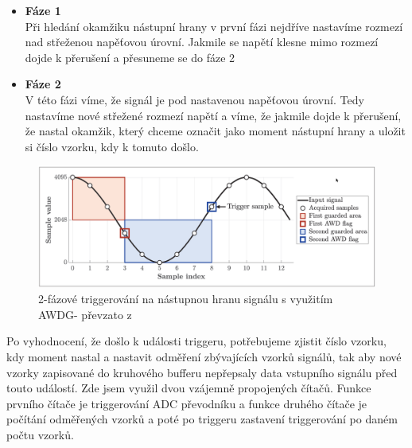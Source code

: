 \begin{itemize}
	\item \textbf{Fáze 1}\\
	Při hledání okamžiku nástupní hrany v první fázi nejdříve nastavíme rozmezí nad střeženou napěťovou úrovní. Jakmile se napětí klesne mimo rozmezí dojde k přerušení a přesuneme se do fáze 2 
	\item \textbf{Fáze 2}\\
	V této fázi víme, že signál je pod nastavenou napěťovou úrovní. Tedy nastavíme nové střežené rozmezí napětí a víme, že jakmile dojde k přerušení, že nastal okamžik, který chceme označit jako moment nástupní hrany a uložit si číslo vzorku, kdy k tomuto došlo.
\end{itemize}
\begin{figure}[H]
	\centering
	\includegraphics[width=1\linewidth]{Figs/Graphs/AWDG_Trigger}
	\caption{2-fázové triggerování na nástupnou hranu signálu s využitím AWDG- převzato z \cite{DujavaDIP}}
	\label{fig:awdgtrigger}
\end{figure}

Po vyhodnocení, že došlo k události triggeru, potřebujeme zjistit číslo vzorku, kdy moment nastal a nastavit odměření zbývajících vzorků signálů, tak aby nové vzorky zapisované do kruhového bufferu nepřepsaly data vstupního signálu před touto událostí. Zde jsem využil dvou vzájemně propojených čítačů. Funkce prvního čítače je triggerování ADC převodníku a funkce druhého čítače je počítání odměřených vzorků a poté po triggeru zastavení triggerování po daném počtu vzorků. 


